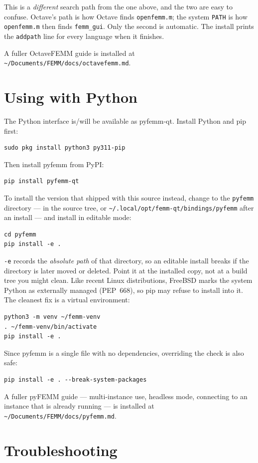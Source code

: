 \documentclass[11pt]{article}
\begin{document}
This is a \emph{different} search path from the one above, and the two are
easy to confuse.  Octave's path is how Octave finds \texttt{openfemm.m};
the system \texttt{PATH} is how \texttt{openfemm.m} then finds
\texttt{femm\_gui}.  Only the second is automatic.  The install prints the
\texttt{addpath} line for every language when it finishes.

A fuller OctaveFEMM guide is installed at
\texttt{\textasciitilde/Documents/FEMM/docs/octavefemm.md}.

\section{Using with Python}

The Python interface is/will be available as pyfemm-qt.  Install Python and
pip first:
\begin{lstlisting}
sudo pkg install python3 py311-pip
\end{lstlisting}
Then install pyfemm from PyPI:
\begin{lstlisting}
pip install pyfemm-qt
\end{lstlisting}
To install the version that shipped with this source instead, change to the
\texttt{pyfemm} directory --- in the source tree, or
\verb+~/.local/opt/femm-qt/bindings/pyfemm+ after an install --- and install
in editable mode:
\begin{lstlisting}
cd pyfemm
pip install -e .
\end{lstlisting}
\texttt{-e} records the \emph{absolute path} of that directory, so an
editable install breaks if the directory is later moved or deleted.  Point
it at the installed copy, not at a build tree you might clean.
Like recent Linux distributions, FreeBSD marks the system Python as
externally managed (PEP~668), so pip may refuse to install into it.  The
cleanest fix is a virtual environment:
\begin{lstlisting}
python3 -m venv ~/femm-venv
. ~/femm-venv/bin/activate
pip install -e .
\end{lstlisting}
Since pyfemm is a single file with no dependencies, overriding the check is
also safe:
\begin{lstlisting}
pip install -e . --break-system-packages
\end{lstlisting}
A fuller pyFEMM guide --- multi-instance use, headless mode, connecting to
an instance that is already running --- is installed at
\texttt{\textasciitilde/Documents/FEMM/docs/pyfemm.md}.

\section{Troubleshooting}
\end{document}
